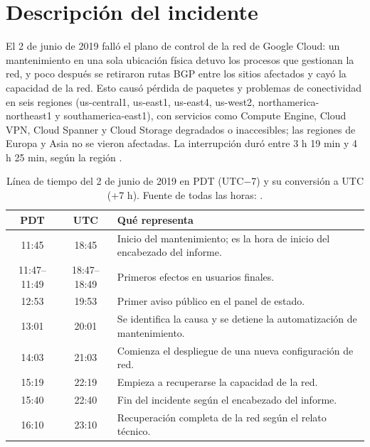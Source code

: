 \section{Descripción del incidente}

El 2 de junio de 2019 falló el plano de control de la red de Google Cloud: un mantenimiento en una sola ubicación física detuvo los procesos que gestionan la red, y poco después se retiraron rutas BGP entre los sitios afectados y cayó la capacidad de la red. Esto causó pérdida de paquetes y problemas de conectividad en seis regiones (us-central1, us-east1, us-east4, us-west2, northamerica-northeast1 y southamerica-east1), con servicios como Compute Engine, Cloud VPN, Cloud Spanner y Cloud Storage degradados o inaccesibles; las regiones de Europa y Asia no se vieron afectadas. La interrupción duró entre 3 h 19 min y 4 h 25 min, según la región \cite{googlecloud19009}.

\begin{table}[htbp]
  \centering
  \caption{Línea de tiempo del 2 de junio de 2019 en PDT (UTC$-$7) y su conversión a UTC (+7 h). Fuente de todas las horas: \cite{googlecloud19009}.}
  \label{tab:linea-tiempo}
  \small
  \begin{tabularx}{\linewidth}{@{}ccX@{}}
    \toprule
    PDT & UTC & Qué representa \\
    \midrule
    11:45 & 18:45 & Inicio del mantenimiento; es la hora de inicio del encabezado del informe. \\
    11:47--11:49 & 18:47--18:49 & Primeros efectos en usuarios finales. \\
    12:53 & 19:53 & Primer aviso público en el panel de estado. \\
    13:01 & 20:01 & Se identifica la causa y se detiene la automatización de mantenimiento. \\
    14:03 & 21:03 & Comienza el despliegue de una nueva configuración de red. \\
    15:19 & 22:19 & Empieza a recuperarse la capacidad de la red. \\
    15:40 & 22:40 & Fin del incidente según el encabezado del informe. \\
    16:10 & 23:10 & Recuperación completa de la red según el relato técnico. \\
    \bottomrule
  \end{tabularx}
\end{table}
